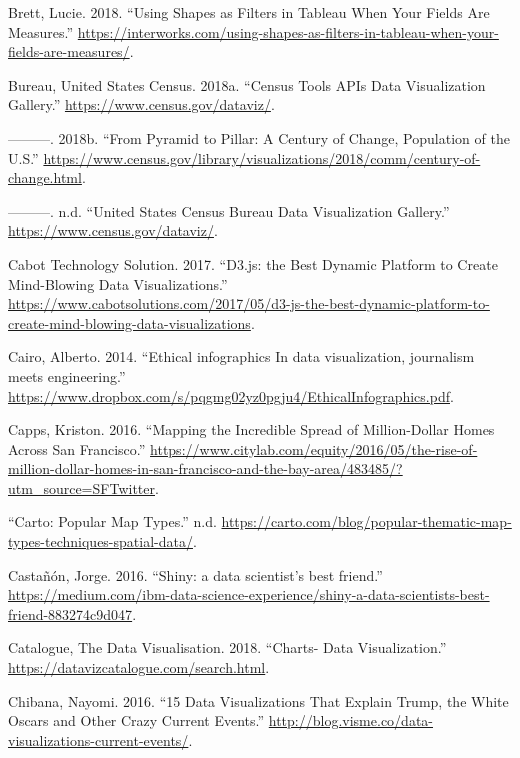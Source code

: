 \documentclass[]{book}
\begin{document}
\leavevmode\hypertarget{ref-measures}{}%
Brett, Lucie. 2018. ``Using Shapes as Filters in Tableau When Your Fields Are Measures.'' \url{https://interworks.com/using-shapes-as-filters-in-tableau-when-your-fields-are-measures/}.

\leavevmode\hypertarget{ref-CensusDataViz}{}%
Bureau, United States Census. 2018a. ``Census Tools APIs Data Visualization Gallery.'' \url{https://www.census.gov/dataviz/}.

\leavevmode\hypertarget{ref-population_pyramid}{}%
---------. 2018b. ``From Pyramid to Pillar: A Century of Change, Population of the U.S.'' \url{https://www.census.gov/library/visualizations/2018/comm/century-of-change.html}.

\leavevmode\hypertarget{ref-census_viz}{}%
---------. n.d. ``United States Census Bureau Data Visualization Gallery.'' \url{https://www.census.gov/dataviz/}.

\leavevmode\hypertarget{ref-d3_interactive_viz}{}%
Cabot Technology Solution. 2017. ``D3.js: the Best Dynamic Platform to Create Mind-Blowing Data Visualizations.'' \url{https://www.cabotsolutions.com/2017/05/d3-js-the-best-dynamic-platform-to-create-mind-blowing-data-visualizations}.

\leavevmode\hypertarget{ref-ethical_infographics}{}%
Cairo, Alberto. 2014. ``Ethical infographics In data visualization, journalism meets engineering.'' \url{https://www.dropbox.com/s/pqgmg02yz0pgju4/EthicalInfographics.pdf}.

\leavevmode\hypertarget{ref-City-Lab}{}%
Capps, Kriston. 2016. ``Mapping the Incredible Spread of Million-Dollar Homes Across San Francisco.'' \url{https://www.citylab.com/equity/2016/05/the-rise-of-million-dollar-homes-in-san-francisco-and-the-bay-area/483485/?utm_source=SFTwitter}.

\leavevmode\hypertarget{ref-Popular_Map_Types1}{}%
``Carto: Popular Map Types.'' n.d. \url{https://carto.com/blog/popular-thematic-map-types-techniques-spatial-data/}.

\leavevmode\hypertarget{ref-shiny_interactive_viz}{}%
Castañón, Jorge. 2016. ``Shiny: a data scientist's best friend.'' \url{https://medium.com/ibm-data-science-experience/shiny-a-data-scientists-best-friend-883274c9d047}.

\leavevmode\hypertarget{ref-charts_viz}{}%
Catalogue, The Data Visualisation. 2018. ``Charts- Data Visualization.'' \url{https://datavizcatalogue.com/search.html}.

\leavevmode\hypertarget{ref-int_viz_current}{}%
Chibana, Nayomi. 2016. ``15 Data Visualizations That Explain Trump, the White Oscars and Other Crazy Current Events.'' \url{http://blog.visme.co/data-visualizations-current-events/}.
\end{document}
